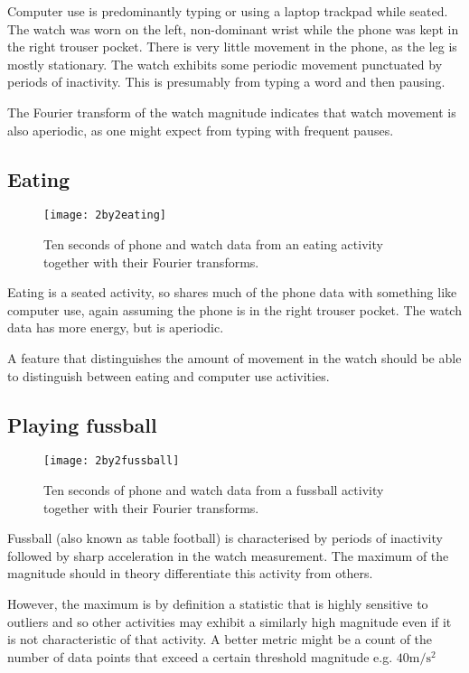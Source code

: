       Computer use is predominantly typing or using a laptop trackpad while seated. The watch was worn on the left, non-dominant wrist while the phone was kept in the right trouser pocket. There is very little movement in the phone, as the leg is mostly stationary. The watch exhibits some periodic movement punctuated by periods of inactivity. This is presumably from typing a word and then pausing.
      
      The Fourier transform of the watch magnitude indicates that watch movement is also aperiodic, as one might expect from typing with frequent pauses.
    \pagebreak[4]
    \subsection{Eating}
      \begin{figure}[!th]
        \centering
        \texttt{[image: 2by2eating]}
        \caption[Eating sample]{Ten seconds of phone and watch data from an eating activity together with their Fourier transforms.}
        \label{fig:2by2eating}
      \end{figure}
      
      Eating is a seated activity, so shares much of the phone data with something like computer use, again assuming the phone is in the right trouser pocket. The watch data has more energy, but is aperiodic.
      
      A feature that distinguishes the amount of movement in the watch should be able to distinguish between eating and computer use activities.
    \pagebreak[4]
    \subsection{Playing fussball}
      \begin{figure}[!th]
        \centering
        \texttt{[image: 2by2fussball]}
        \caption[Fussball sample]{Ten seconds of phone and watch data from a fussball activity together with their Fourier transforms.}
        \label{fig:2by2fussball}
      \end{figure}
      
      Fussball (also known as table football) is characterised by periods of inactivity followed by sharp acceleration in the watch measurement. The maximum of the magnitude should in theory differentiate this activity from others.
      
      However, the maximum is by definition a statistic that is highly sensitive to outliers and so other activities may exhibit a similarly high magnitude even if it is not characteristic of that activity. A better metric might be a count of the number of data points that exceed a certain threshold magnitude e.g. $40 \si{\metre\per\square\second}$ 
    \pagebreak[4]
